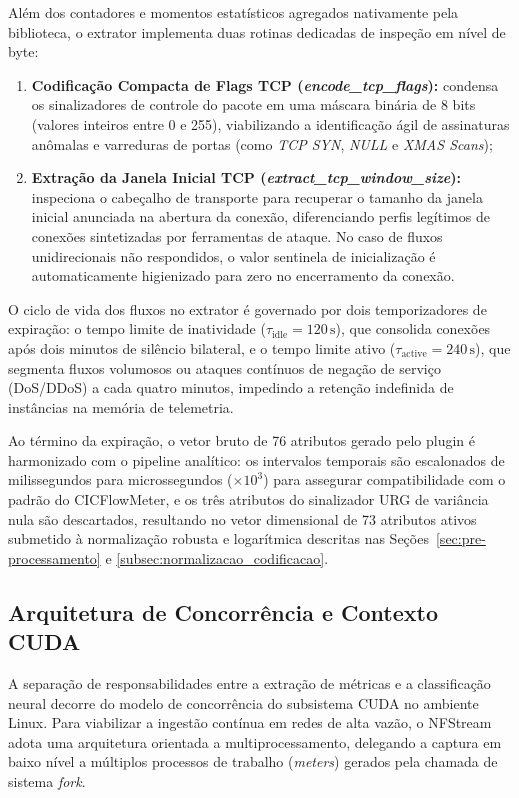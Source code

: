 Além dos contadores e momentos estatísticos agregados nativamente pela biblioteca, o extrator implementa duas rotinas
dedicadas de inspeção em nível de byte:
\begin{enumerate}
    \item \textbf{Codificação Compacta de Flags TCP (\emph{encode\_tcp\_flags}):} condensa os sinalizadores de controle
    do pacote em uma máscara binária de 8 bits (valores inteiros entre 0 e 255), viabilizando a identificação ágil de
    assinaturas anômalas e varreduras de portas (como \emph{TCP SYN}, \emph{NULL} e \emph{XMAS Scans});
    \item \textbf{Extração da Janela Inicial TCP (\emph{extract\_tcp\_window\_size}):} inspeciona o cabeçalho de
    transporte para recuperar o tamanho da janela inicial anunciada na abertura da conexão, diferenciando perfis
    legítimos de conexões sintetizadas por ferramentas de ataque. No caso de fluxos unidirecionais não respondidos, o
    valor sentinela de inicialização é automaticamente higienizado para zero no encerramento da conexão.
\end{enumerate}

O ciclo de vida dos fluxos no extrator é governado por dois temporizadores de expiração: o tempo limite de inatividade
($\tau_{\mathrm{idle}} = 120\,\mathrm{s}$), que consolida conexões após dois minutos de silêncio bilateral, e o tempo
limite ativo ($\tau_{\mathrm{active}} = 240\,\mathrm{s}$), que segmenta fluxos volumosos ou ataques contínuos de
negação de serviço (DoS/DDoS) a cada quatro minutos, impedindo a retenção indefinida de instâncias na memória de
telemetria.

Ao término da expiração, o vetor bruto de 76 atributos gerado pelo plugin é harmonizado com o pipeline analítico: os
intervalos temporais são escalonados de milissegundos para microssegundos ($\times 10^3$) para assegurar
compatibilidade com o padrão do CICFlowMeter, e os três atributos do sinalizador URG de variância nula são descartados,
resultando no vetor dimensional de 73 atributos ativos submetido à normalização robusta e logarítmica descritas nas
Seções~\ref{sec:pre-processamento} e \ref{subsec:normalizacao_codificacao}.

\subsection{Arquitetura de Concorrência e Contexto CUDA}
\label{subsec:concorrencia_cuda}

A separação de responsabilidades entre a extração de métricas e a classificação neural decorre do modelo de concorrência
do subsistema CUDA no ambiente Linux. Para viabilizar a ingestão contínua em redes de alta vazão, o NFStream adota uma
arquitetura orientada a multiprocessamento, delegando a captura em baixo nível a múltiplos processos de trabalho
(\emph{meters}) gerados pela chamada de sistema \emph{fork}.

